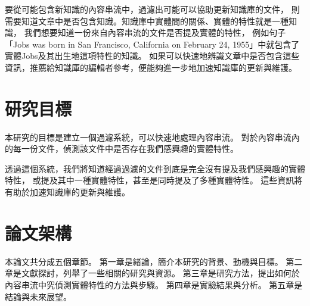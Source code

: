 要從可能包含新知識的內容串流中，過濾出可能可以協助更新知識庫的文件，
則需要知道文章中是否包含知識。知識庫中實體間的關係、實體的特性就是一種知識，
我們想要知道一份來自內容串流的文件是否提及實體的特性，
例如句子「Jobs was born in San Francisco, California on February 24, 1955」中就包含了實體Jobs及其出生地這項特性的知識。
如果可以快速地辨識文章中是否包含這些資訊，推薦給知識庫的編輯者參考，便能夠進一步地加速知識庫的更新與維護。

%
%
\section{研究目標}
本研究的目標是建立一個過濾系統，可以快速地處理內容串流。
對於內容串流內的每一份文件，偵測該文件中是否存在我們感興趣的實體特性。

透過這個系統，我們將知道經過過濾的文件到底是完全沒有提及我們感興趣的實體特性，
或提及其中一種實體特性，甚至是同時提及了多種實體特性。
這些資訊將有助於加速知識庫的更新與維護。

%
%
\section{論文架構}
本論文共分成五個章節。
第一章是緒論，簡介本研究的背景、動機與目標。
第二章是文獻探討，列舉了一些相關的研究與資源。
第三章是研究方法，提出如何於內容串流中究偵測實體特性的方法與步驟。
第四章是實驗結果與分析。    %
第五章是結論與未來展望。    %

